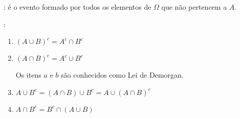 \documentclass[11pt,a4paper]{book}
\begin{document}
\begin{description}
    \begin{figure}[H]
      \centering
      
      \caption{}
      \label{fig:5}
    \end{figure}
  \item [Evento Complementar ($\bar{A}$ ou $A^c$)]: é o evento formado por todos os elementos de $\Omega$ que não pertencem a $A$.
    \begin{description}
      \begin{figure}[H]
        \centering
        
        \caption{}
        \label{fig:6}
      \end{figure}

    \item [Alguns exemplos de eventos complementares]: 

      \begin{enumerate}[align=left,label=({\alph*}) ]

        \item $(A \cup B )^c = A^c \cap B^c$
          \begin{figure}[H]
            \centering
            
            \caption{}
            \label{fig:7}
          \end{figure}

        \item $(A \cap B)^c = A^c \cup B^c $
          \begin{figure}[H]
            \centering
            
            \caption{}
            \label{figura:8}
          \end{figure}

          Os itens $a$ e $b$ são conhecidos como Lei de Demorgan.
        \item $A \cup B^c = ( A \cap B ) \cup B^c = A \cup (A \cap B)^c$
          \begin{figure}[H]
            \centering
            
            \caption{}
            \label{figura:9}

          \end{figure}

        \item  $A \cap B^c = B^c \cap (A \cup B)$
          \begin{figure}[H]
            \centering
            
            \caption{}
            \label{fig:10}
          \end{figure}

      \end{enumerate}


\end{description}
\end{description}
\end{document}
